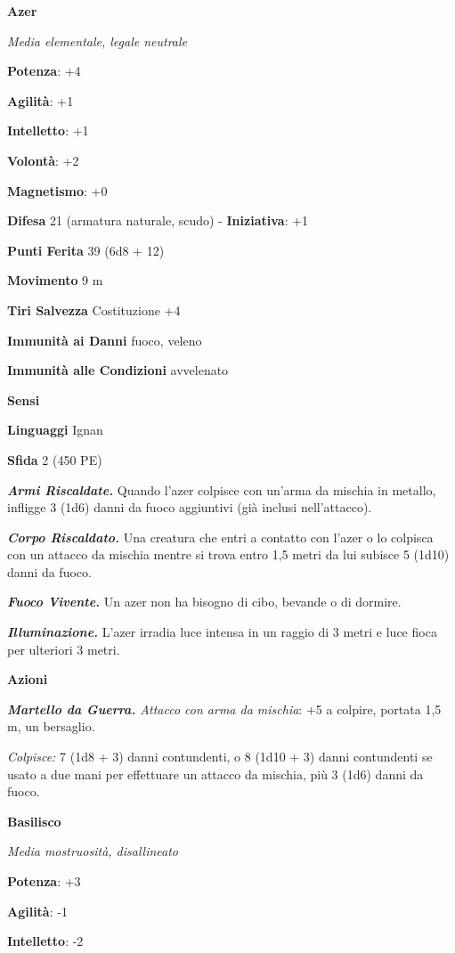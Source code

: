 \begin{multicols}{2}
\textbf{Azer}

\emph{Media elementale, legale neutrale}

\textbf{Potenza}: +4

\textbf{Agilità}: +1

\textbf{Intelletto}: +1

\textbf{Volontà}: +2

\textbf{Magnetismo}: +0

\textbf{Difesa} 21 (armatura naturale, scudo) - \textbf{Iniziativa}: +1

\textbf{Punti Ferita} 39 (6d8 + 12)

\textbf{Movimento} 9 m

\textbf{Tiri Salvezza} Costituzione +4

\textbf{Immunità ai Danni} fuoco, veleno

\textbf{Immunità alle Condizioni} avvelenato

\textbf{Sensi} 

\textbf{Linguaggi} Ignan

\textbf{Sfida} 2 (450 PE)

\emph{\textbf{Armi Riscaldate.}} Quando l'azer colpisce con un'arma da
mischia in metallo, infligge 3 (1d6) danni da fuoco aggiuntivi (già
inclusi nell'attacco).

\emph{\textbf{Corpo Riscaldato.}} Una creatura che entri a contatto con
l'azer o lo colpisca con un attacco da mischia mentre si trova entro 1,5
metri da lui subisce 5 (1d10) danni da fuoco.

\emph{\textbf{Fuoco Vivente.}} Un azer non ha bisogno di cibo, bevande o
di dormire.

\emph{\textbf{Illuminazione.}} L'azer irradia luce intensa in un raggio
di 3 metri e luce fioca per ulteriori 3 metri.

\textbf{Azioni}

\emph{\textbf{Martello da Guerra.} Attacco con arma da mischia}: +5 a
colpire, portata 1,5 m, un bersaglio.

\emph{Colpisce:} 7 (1d8 + 3) danni contundenti, o 8 (1d10 + 3) danni
contundenti se usato a due mani per effettuare un attacco da mischia,
più 3 (1d6) danni da fuoco.

\textbf{Basilisco}

\emph{Media mostruosità, disallineato}

\textbf{Potenza}: +3

\textbf{Agilità}: -1

\textbf{Intelletto}: -2


\end{multicols}
